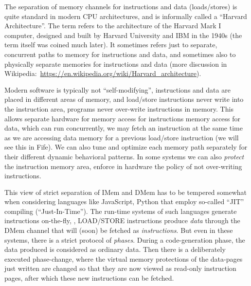 \label{Sec_Harvard_architecture}


The separation of memory channels for instructions and data
(loads/stores) is quite standard in modern CPU architectures, and is
informally called a ``Harvard Architecture''.  The term refers to the
architecture of the Harvard Mark I computer, designed and built by
Harvard University and IBM in the 1940s (the term itself was coined
much later).  It sometimes refers just to separate, concurrent paths
to memory for instructions and data, and sometimes also to physically
separate memories for instructions and data (more discussion in
Wikipedia:~\url{https://en.wikipedia.org/wiki/Harvard_architecture}).

Modern software is typically not ``self-modifying'', {\ie}
instructions and data are placed in different areas of memory, and
load/store instructions never write into the instruction area, {\ie}
programs never over-write instructions in memory.  This allows
separate hardware for memory access for instructions {\vs} memory
access for data, which can run concurrently, {\ie} we may fetch an
instruction at the same time as we are accessing data memory for a
previous load/store instruction (we will see this in Fife).  We can
also tune and optimize each memory path separately for their different
dynamic behavioral patterns.  In some systems we can also
\emph{protect} the instruction memory area, {\ie} enforce in hardware
the policy of not over-writing instructions.


This view of strict separation of IMem and DMem has to be tempered
somewhat when considering languages like JavaScript, Python {\etc}
that employ so-called ``JIT'' compiling (``Just-In-Time'').  The
run-time systems of such languages generate instructions on-the-fly,
{\ie}, LOAD/STORE instructions produce \emph{data} through the DMem
channel that will (soon) be fetched as \emph{instructions}.  But even
in these systems, there is a strict protocol of \emph{phases}.  During
a code-generation phase, the data produced is considered as ordinary
data.  Then there is a deliberately executed phase-change, where the
virtual memory protections of the data-pages just written are changed
so that they are now viewed as read-only instruction pages, after
which these new instructions can be fetched.

